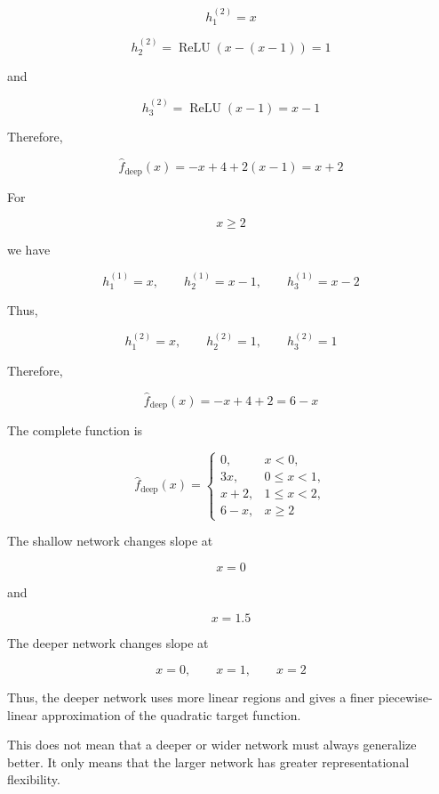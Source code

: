 \documentclass[10pt]{article}
\begin{document}
\[
h^{(2)}_1=x
\]

\[
h^{(2)}_2=\operatorname{ReLU}(x-(x-1))=1
\]

and

\[
h^{(2)}_3=\operatorname{ReLU}(x-1)=x-1
\]

Therefore,

\[
\hat f_{\mathrm{deep}}(x)=-x+4+2(x-1)=x+2
\]

For

\[
x\geq2
\]

we have

\[
h^{(1)}_1=x,
\qquad
h^{(1)}_2=x-1,
\qquad
h^{(1)}_3=x-2
\]

Thus,

\[
h^{(2)}_1=x,
\qquad
h^{(2)}_2=1,
\qquad
h^{(2)}_3=1
\]

Therefore,

\[
\hat f_{\mathrm{deep}}(x)=-x+4+2=6-x
\]

The complete function is

\[
\hat f_{\mathrm{deep}}(x)=
\begin{cases}
0, & x<0,\\
3x, & 0\leq x<1,\\
x+2, & 1\leq x<2,\\
6-x, & x\geq2
\end{cases}
\]

The shallow network changes slope at

\[
x=0
\]

and

\[
x=1.5
\]

The deeper network changes slope at

\[
x=0,\qquad x=1,\qquad x=2
\]

Thus, the deeper network uses more linear regions and gives a finer piecewise-linear approximation of the quadratic target function.

This does not mean that a deeper or wider network must always generalize better. It only means that the larger network has greater representational flexibility.
\end{document}
